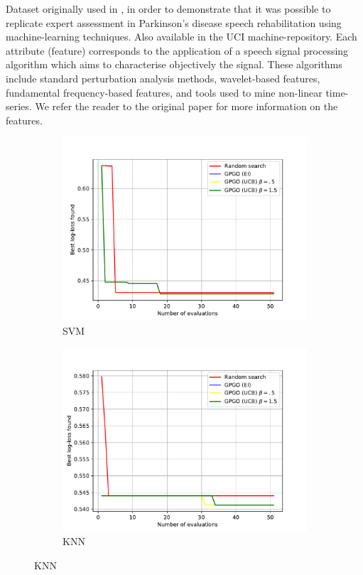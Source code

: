\documentclass[10pt,a4paper,twoside]{book}
\begin{document}
Dataset originally used in \cite{Tsanas2014}, in order to demonstrate that it was possible to replicate expert assessment in Parkinson's disease speech rehabilitation using machine-learning techniques. Also available in the UCI machine-repository. Each attribute (feature) corresponds to the application of a speech signal processing algorithm which aims to characterise objectively the signal. These algorithms include standard perturbation analysis methods, wavelet-based features, fundamental frequency-based features, and tools used to mine non-linear time-series. We refer the reader to the original paper for more information on the features.

\begin{figure}[ht]
  \centering
  \caption{Benchmarking results for the LSVT Voice Rehabilitation dataset.}
  \begin{subfigure}[t]{0.5\textwidth}
  	\caption{SVM}
    \centering\includegraphics[width=\textwidth]{figures/chapter4/lsvt/svm}
  \end{subfigure}%
  \begin{subfigure}[t]{0.5\textwidth}
    \caption{KNN}
    \centering\includegraphics[width=\textwidth]{figures/chapter4/lsvt/knn}

\end{subfigure}
\end{figure}
\end{document}
